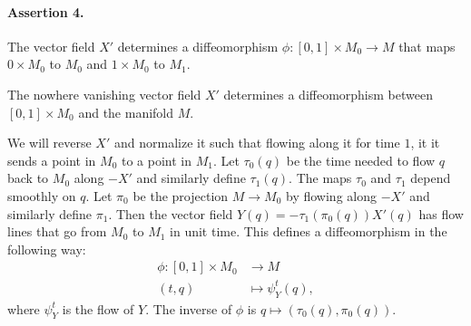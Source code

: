 \begin{myproof}
\paragraph{Assertion 4.}
The vector field $X'$ determines a diffeomorphism $\phi: [0, 1] \times M_0 \to M$ that maps $0 \times M_0$ to $M_0$ and $1 \times M_0$ to $ M_1$.
\begin{myproof}
    \begin{marginfigure}
        \centering
        \caption{The nowhere vanishing vector field $X'$ determines a diffeomorphism between  $[0,1] \times M_0$ and the manifold $M$.}
        \label{fig:assertion-4}
    \end{marginfigure}
    We will reverse $X'$ and normalize it such that flowing along it for time $1$, it it sends a point in  $M_0$ to a point in $M_1$.
    Let $\tau_0(q)$ be the time needed to flow $q$ back to $M_0$ along $-X'$ and similarly define $\tau_1(q)$. The maps $\tau_0$ and $\tau_1$ depend smoothly on $q$.
    Let $\pi_0$ be the projection  $M \to M_0$ by flowing along $-X'$ and similarly define $\pi_1$.
    Then the vector field $Y(q) = -\tau_1(\pi_0(q)) X'(q)$ has flow lines that go from $ M_0$ to $M_1$ in unit time.
    This defines a diffeomorphism in the following way:
    \begin{align*}
        \phi: [0, 1] \times M_0 &\longrightarrow M \\
        (t, q) &\longmapsto \psi^{t}_Y (q)
    ,\end{align*}
    where $\psi^{t}_Y$ is the flow of $Y$.
    The inverse of $\phi$ is $q \mapsto (\tau_0(q), \pi_0(q))$.
\end{myproof}


\end{myproof}
